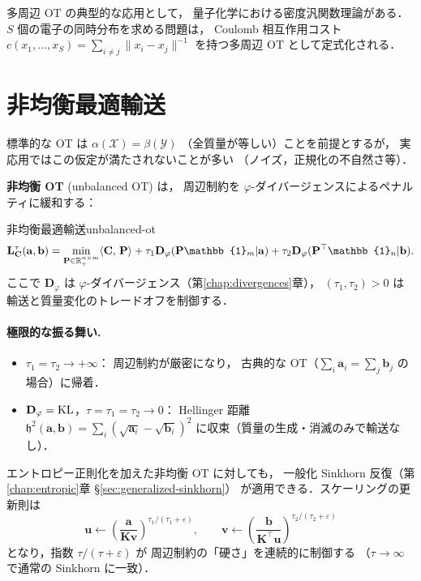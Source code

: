 多周辺 OT の典型的な応用として，
量子化学における密度汎関数理論がある．
$S$ 個の電子の同時分布を求める問題は，
Coulomb 相互作用コスト
$c(x_1, \ldots, x_S) = \sum_{i \neq j} \|x_i - x_j\|^{-1}$
を持つ多周辺 OT として定式化される．


\section{非均衡最適輸送}\label{sec:unbalanced}

標準的な OT は $\alpha(\mathcal{X}) = \beta(\mathcal{Y})$
（全質量が等しい）ことを前提とするが，
実応用ではこの仮定が満たされないことが多い
（ノイズ，正規化の不自然さ等）．

\textbf{非均衡 OT} (unbalanced OT) は，
周辺制約を $\varphi$-ダイバージェンスによるペナルティに緩和する：

\begin{definition}{非均衡最適輸送}{unbalanced-ot}
\begin{equation}\label{eq:unbalanced}
  \mathbf{L}^\tau_{\mathbf{C}}(\mathbf{a}, \mathbf{b})
  = \min_{\mathbf{P} \in \R^{n \times m}_+}
  \inner{\mathbf{C}}{\mathbf{P}}
  + \tau_1 \mathbf{D}_\varphi(\mathbf{P}\mathbb{1}_m | \mathbf{a})
  + \tau_2 \mathbf{D}_\varphi(\mathbf{P}^\top \mathbb{1}_n | \mathbf{b}).
\end{equation}
ここで $\mathbf{D}_\varphi$ は $\varphi$-ダイバージェンス（第\ref{chap:divergences}章），
$(\tau_1, \tau_2) > 0$ は輸送と質量変化のトレードオフを制御する．
\end{definition}

\paragraph{極限的な振る舞い.}
\begin{itemize}
  \item $\tau_1 = \tau_2 \to +\infty$：
    周辺制約が厳密になり，
    古典的な OT（$\sum_i \mathbf{a}_i = \sum_j \mathbf{b}_j$ の場合）に帰着．
  \item $\mathbf{D}_\varphi = \operatorname{KL}$，$\tau = \tau_1 = \tau_2 \to 0$：
    Hellinger 距離
    $\mathfrak{h}^2(\mathbf{a}, \mathbf{b})
    = \sum_i (\sqrt{\mathbf{a}_i} - \sqrt{\mathbf{b}_i})^2$
    に収束（質量の生成・消滅のみで輸送なし）．
\end{itemize}

エントロピー正則化を加えた非均衡 OT に対しても，
一般化 Sinkhorn 反復（第\ref{chap:entropic}章 §\ref{sec:generalized-sinkhorn}）
が適用できる．スケーリングの更新則は
\begin{equation}\label{eq:unbalanced-sinkhorn}
  \mathbf{u} \leftarrow
  \left(\frac{\mathbf{a}}{\mathbf{K}\mathbf{v}}\right)^{\tau_1/(\tau_1+\varepsilon)},
  \qquad
  \mathbf{v} \leftarrow
  \left(\frac{\mathbf{b}}{\mathbf{K}^\top \mathbf{u}}\right)^{\tau_2/(\tau_2+\varepsilon)}
\end{equation}
となり，指数 $\tau/(\tau+\varepsilon)$ が
周辺制約の「硬さ」を連続的に制御する
（$\tau \to \infty$ で通常の Sinkhorn に一致）．


